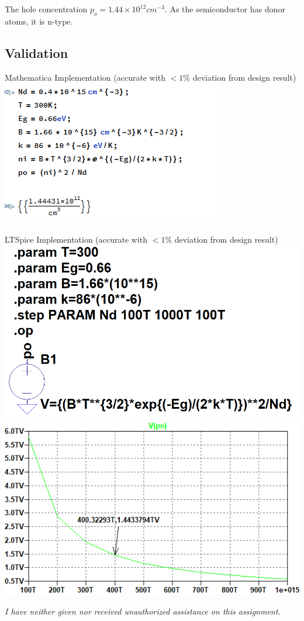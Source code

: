 \documentclass[12pt,letterpaper,titlepage]{article}
\begin{document}
\begin{raggedright}
The hole concentration $p_o = 1.44 \times 10^{12} cm^{-3}$. As the semiconductor has donor atoms, it is n-type.

\pagebreak
\subsection{Validation}

\begin{center}
Mathematica Implementation (accurate with $< 1\%$ deviation from design result)
\includegraphics[width=.5\textwidth, height=\textheight, keepaspectratio=true]{ds2a}
\end{center}

\begin{center}
LTSpice Implementation (accurate with $< 1\%$ deviation from design result)
\includegraphics[width=.4\textwidth, height=\textheight, keepaspectratio=true]{ds2b}
\includegraphics[width=.4\textwidth, height=\textheight, keepaspectratio=true]{ds2c}
\end{center}

\textit{I have neither given nor received unauthorized assistance on this assignment.}


\end{raggedright}
\end{document}
